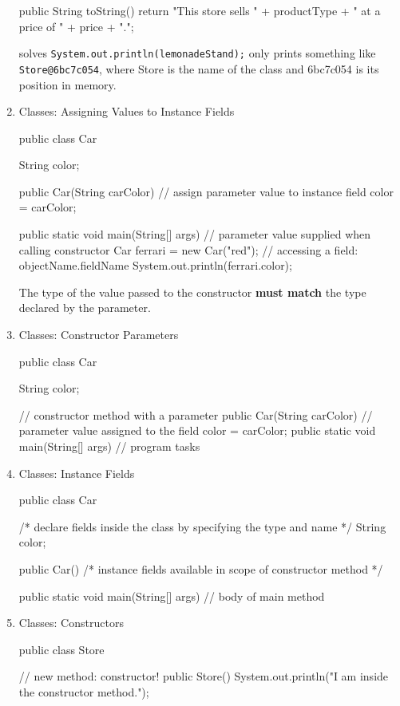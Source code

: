 \documentclass[a4paper,12pt]{article}
\begin{document}
\begin{enumerate}
\begin{javacode}
{  public String toString() {
    return "This store sells " + productType + " at a price of " + price + ".";
  }
}
\end{javacode}
solves \verb|System.out.println(lemonadeStand);| only prints something like \verb|Store@6bc7c054|, where Store is the name of the class and 6bc7c054 is its position in memory.

\item Classes: Assigning Values to Instance Fields
\begin{javacode}
public class Car {
  String color;

  public Car(String carColor) {
    // assign parameter value to instance field
    color = carColor;
  }

  public static void main(String[] args) {
    // parameter value supplied when calling constructor
    Car ferrari = new Car("red");
		// accessing a field: objectName.fieldName
    System.out.println(ferrari.color);
  }
}
\end{javacode}
The type of the value passed to the constructor \textbf{must match} the type declared by the parameter.

\item Classes: Constructor Parameters
\begin{javacode}
public class Car {
  String color;

  // constructor method with a parameter
  public Car(String carColor) {
    // parameter value assigned to the field
    color = carColor;
  }
  public static void main(String[] args) {
    // program tasks
  }
}
\end{javacode}

\item Classes: Instance Fields
\begin{javacode}
public class Car {
  /*
  declare fields inside the class
  by specifying the type and name
  */
  String color;

  public Car() {
    /* 
    instance fields available in
    scope of constructor method
    */
  }

  public static void main(String[] args) {
    // body of main method
  }
}
\end{javacode}

\item Classes: Constructors
\begin{javacode}
public class Store {
  
  // new method: constructor!
  public Store() {
    System.out.println("I am inside the constructor method.");
  }
  
}
\end{javacode}
\end{enumerate}
\end{document}
